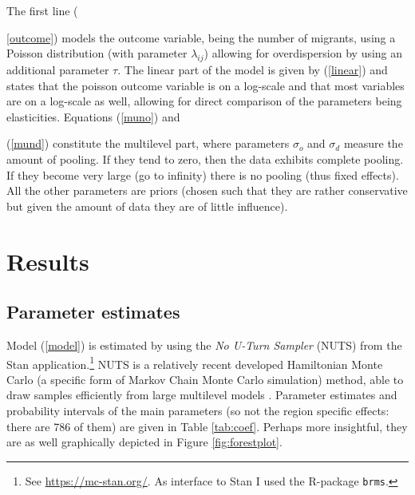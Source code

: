 \documentclass[fleqn,10pt]{SelfArx} %
\begin{document}
        The first line ({\ref{outcome}) models the outcome variable,
          being the number of migrants, using a Poisson distribution
          (with parameter $\lambda_{ij}$) allowing for overdispersion
          by using an additional parameter $\tau$. The linear part of
          the model is given by (\ref{linear}) and states that the
          poisson outcome variable is on a log-scale and that most
          variables are on a log-scale as well, allowing for direct
          comparison of the parameters being elasticities. Equations
          (\ref{muno}) and {(\ref{mund}) constitute the multilevel
            part, where parameters $\sigma_o$ and $\sigma_d$ measure
            the amount of pooling. If they tend to zero, then the
            data exhibits complete pooling. If they become very large
            (go to infinity) there is no pooling (thus fixed
            effects). All the other parameters are priors (chosen such
            that they are rather conservative but given the amount of
            data they are of little influence).
          
        \section{Results}

        \subsection{Parameter estimates}
        
        Model (\ref{model}) is estimated by using the \emph{No U-Turn
          Sampler} (NUTS) from the Stan application.\footnote{See \href{https://mc-stan.org/}{https://mc-stan.org/}. As interface to Stan
          \citep[see for an overview article of
          Stan][]{carpenter2017stan} I used the R-package \citep{brms} \texttt{brms}.} NUTS is a relatively recent developed Hamiltonian Monte Carlo (a specific form of Markov
        Chain Monte Carlo simulation) method, able to draw samples
        efficiently from large multilevel models
        \citep{hoffman2014no}. Parameter estimates and probability
        intervals of the main parameters (so not the region specific
        effects: there are 786 of them) are given in Table
        \ref{tab:coef}. Perhaps more insightful, they are as well graphically
        depicted in Figure \ref{fig:forestplot}.

}}
\end{document}
